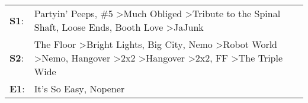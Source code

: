 \begin{supertabular}{p{0.03\textwidth}p{0.92\textwidth}}
 \textbf{S1}:  &                                                                                                                                                                              Partyin' Peeps\textsuperscript{}, \enspace \#5\textsuperscript{} \textgreater \enspace Much Obliged\textsuperscript{} \textgreater \enspace Tribute to the Spinal Shaft\textsuperscript{}, \enspace Loose Ends\textsuperscript{}, \enspace Booth Love\textsuperscript{} \textgreater \enspace JaJunk\textsuperscript{}  \enspace  \\
 \textbf{S2}:  &  The Floor\textsuperscript{} \textgreater \enspace Bright Lights, Big City\textsuperscript{}, \enspace Nemo\textsuperscript{} \textgreater \enspace Robot World\textsuperscript{} \textgreater \enspace Nemo\textsuperscript{}, \enspace Hangover\textsuperscript{} \textgreater \enspace 2x2\textsuperscript{} \textgreater \enspace Hangover\textsuperscript{} \textgreater \enspace 2x2\textsuperscript{}, \enspace FF\textsuperscript{} \textgreater \enspace The Triple Wide\textsuperscript{}  \enspace  \\
 \textbf{E1}:  &                                                                                                                                                                                                                                                                                                                                                                                                                                  It's So Easy\textsuperscript{}, \enspace Nopener\textsuperscript{}  \enspace  \\
\end{supertabular}
